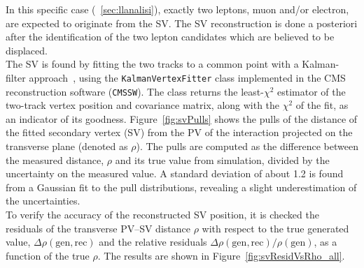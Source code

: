 In this specific case (~\ref{sec:llanalisi}), exactly two leptons, muon and/or electron, are
expected to originate from the SV. The SV reconstruction is done a
posteriori after the identification of the two lepton candidates which
are believed to be displaced. \\
The SV is found by fitting the two tracks to a common point with a Kalman-filter
approach~\cite{BILLOIR1990219}, using the \texttt{KalmanVertexFitter}
class implemented in the CMS reconstruction software (\texttt{CMSSW}).
The class returns the least-$\chi^2$ estimator of the two-track vertex
position and covariance matrix, along with the $\chi^2$ of the fit, as
an indicator of its goodness.
Figure~\ref{fig:svPulls} shows the pulls of the distance of the fitted
secondary vertex (SV) from the PV of the interaction projected on the
transverse plane (denoted as $\rho$). The pulls
are computed as the difference between the measured distance, $\rho$
and its true value from simulation, divided by the uncertainty
on the measured value. A standard deviation of about 1.2 is found from
a Gaussian fit to the pull distributions, revealing a slight
underestimation of the uncertainties.\\
To verify the accuracy of the reconstructed SV position, it is checked the residuals of the
transverse PV--SV distance $\rho$ with respect to the true generated
value, $\Delta\rho(\mathrm{gen,rec})$ and the relative residuals
$\Delta\rho(\mathrm{gen,rec})/\rho(\mathrm{gen})$, as a
function of the true $\rho$. The results are shown in
Figure~\ref{fig:svResidVsRho_all}.


